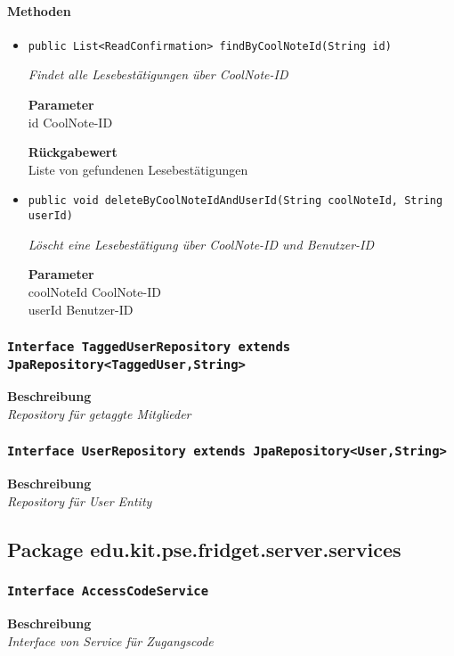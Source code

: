     \paragraph*{Methoden}
    \begin{itemize}
    	\item{\texttt{public List<ReadConfirmation> findByCoolNoteId(String id)}}
    	
    	\textit{Findet alle Lesebestätigungen über CoolNote-ID}
    	
    	\textbf{Parameter} \\
    	id CoolNote-ID
    	
    	\textbf{Rückgabewert} \\
    	Liste von gefundenen Lesebestätigungen        \item{\texttt{public void deleteByCoolNoteIdAndUserId(String coolNoteId, String userId)}}
    	
    	\textit{Löscht eine Lesebestätigung über CoolNote-ID und Benutzer-ID}
    	
    	\textbf{Parameter} \\
    	coolNoteId CoolNote-ID\\
    	userId Benutzer-ID
    	
    	
    \end{itemize}
    \subsubsection{\texttt{Interface TaggedUserRepository extends JpaRepository<TaggedUser,String>}}
    \textbf{Beschreibung} \\
    \textit{Repository für getaggte Mitglieder}
    \subsubsection{\texttt{Interface UserRepository extends JpaRepository<User,String>}}
    \textbf{Beschreibung} \\
    \textit{Repository für User Entity}
    \subsection{Package edu.kit.pse.fridget.server.services}
    \subsubsection{\texttt{Interface AccessCodeService}}
    \textbf{Beschreibung} \\
    \textit{Interface von Service für Zugangscode}
